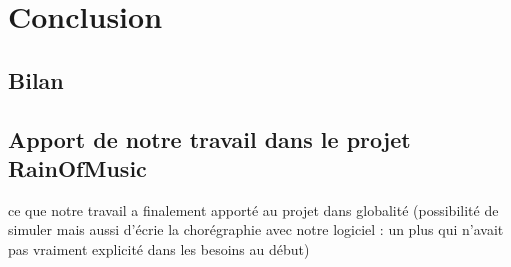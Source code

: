 \section{Conclusion}
\subsection{Bilan}


\subsection{Apport de notre travail dans le projet RainOfMusic}
ce que notre travail a finalement apporté au projet dans globalité (possibilité de simuler mais aussi d'écrie la chorégraphie avec notre logiciel : un plus qui n'avait pas vraiment explicité dans les besoins au début)

